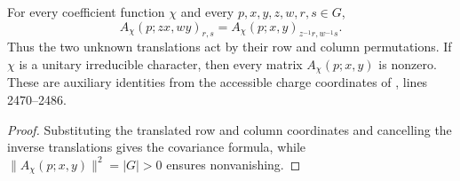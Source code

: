 \begin{lemma}
    \label{thm:peps_regular_charge_coordinates_covariance}
    \leanok
    For every coefficient function $\chi$ and every $p,x,y,z,w,r,s\in G$,
    \[
        A_\chi(p;zx,wy)_{r,s}
        =A_\chi(p;x,y)_{z^{-1}r,w^{-1}s}.
    \]
    Thus the two unknown translations act by their row and column
    permutations. If $\chi$ is a unitary irreducible character, then every
    matrix $A_\chi(p;x,y)$ is nonzero. These are auxiliary identities from
    the accessible charge coordinates of
    \cite[charge detection]{Schuch2010PEPS}, lines 2470--2486.
\end{lemma}
\begin{proof}\leanok
    Substituting the translated row and column coordinates and cancelling the
    inverse translations gives the covariance formula, while
    $\|A_\chi(p;x,y)\|^2=|G|>0$ ensures nonvanishing.
\end{proof}
